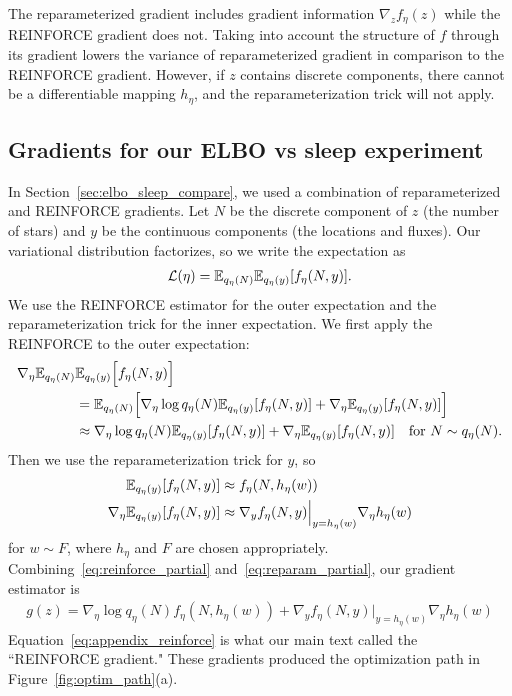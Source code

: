 The reparameterized gradient includes gradient information $\nabla_z f_\eta(z)$ while the REINFORCE gradient does not. Taking into account the structure of $f$ through its gradient lowers the variance of reparameterized gradient in comparison to the REINFORCE gradient.
However, if $z$ contains discrete components, there cannot be a differentiable mapping $h_\eta$, and the reparameterization trick will not apply.

\subsection{Gradients for our ELBO vs sleep experiment}
In Section~\ref{sec:elbo_sleep_compare}, we used a combination of reparameterized and REINFORCE gradients.
Let $N$ be the discrete component of $z$ (the number of stars) and $y$ be the continuous components (the locations and fluxes).
Our variational distribution factorizes, so we write the expectation as
\begin{align}
 \mathcal{L}(\eta) = \mathbb{E}_{q_\eta(N)}\mathbb{E}_{q_\eta(y)}[f_\eta(N, y)].
 \label{eq:elbo_factorized}
\end{align}
We use the REINFORCE estimator for the outer expectation and the reparameterization trick for the inner expectation. We first apply the REINFORCE to the outer expectation:
\begin{align}
    \nabla_\eta  \mathbb{E}_{q_\eta(N)}&\mathbb{E}_{q_\eta(y)}\Big[f_\eta(N, y)\Big] \\
    &=  \mathbb{E}_{q_\eta(N)}\Big[ \nabla_\eta \log q_\eta(N) \mathbb{E}_{q_\eta(y)}[f_\eta(N, y)] +
    \nabla_\eta \mathbb{E}_{q_\eta(y)}[f_\eta(N, y)] \Big]\\
    &\approx \nabla_\eta \log q_\eta(N) \mathbb{E}_{q_\eta(y)}[f_\eta(N, y)] +
    \nabla_\eta \mathbb{E}_{q_\eta(y)}[f_\eta(N, y)] \quad \text{for } N \sim q_\eta(N).
    \label{eq:reinforce_partial}
\end{align}
Then we use the reparameterization trick for $y$, so
\begin{align}
    \mathbb{E}_{q_\eta(y)}[f_\eta(N, y)] &\approx f_\eta(N, h_\eta(w))\\
    \nabla_\eta \mathbb{E}_{q_\eta(y)}[f_\eta(N, y)] &\approx  \nabla_y f_\eta(N, y)\Big|_{y = h_\eta(w)}
    \nabla_\eta h_\eta(w)
    \label{eq:reparam_partial}
\end{align}
for $w \sim F$, where $h_\eta$ and $F$ are chosen appropriately. Combining~\eqref{eq:reinforce_partial} and~\eqref{eq:reparam_partial}, our gradient estimator is
\begin{align}
    g(z) = \nabla_\eta \log q_\eta(N)
    f_\eta(N, h_\eta(w)) +
    \nabla_y f_\eta(N, y)\Big|_{y = h_\eta(w)}
    \nabla_\eta h_\eta(w)
    \label{eq:appendix_reinforce}
\end{align}
Equation~\ref{eq:appendix_reinforce} is what our main text called the ``REINFORCE gradient."
These gradients produced the optimization path in Figure~\ref{fig:optim_path}(a).

